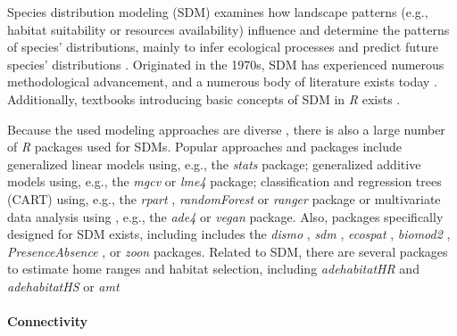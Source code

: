 \documentclass[smallextended]{svjour3}       %
\begin{document}
Species distribution modeling (SDM) examines how landscape patterns (e.g., habitat suitability or resources availability) influence and determine the patterns of species' distributions, mainly to infer ecological processes and predict future species' distributions \cite{Wiersma2011}.
Originated in the 1970s, SDM has experienced numerous methodological advancement, and a numerous body of literature exists today \cite{Zimmermann2010,Norberg2019}.
Additionally, textbooks introducing basic concepts of SDM in \emph{R} exists \cite{Guisan2017,Fletcher2019}.

Because the used modeling approaches are diverse \cite{Hooten2011,Kerr2011,Fletcher2019}, there is also a large number of \emph{R} packages used for SDMs.
Popular approaches and packages include generalized linear models using, e.g., the \emph{stats} \cite{RCoreTeam2019} package; generalized additive models using, e.g., the \emph{mgcv} \cite{Wood2017} or \emph{lme4} \cite{Bates2015} package; classification and regression trees (CART) using, e.g., the \emph{rpart} \cite{Therneau2019}, \emph{randomForest} \cite{Liaw2002} or \emph{ranger} \cite{Wright2017} package or multivariate data analysis using , e.g., the \emph{ade4} \cite{Dray2007} or \emph{vegan} \cite{Oksanen2019} package.
Also, packages specifically designed for SDM exists, including includes the \emph{dismo} \cite{Hijmans2017}, \emph{sdm} \cite{Naimi2016}, \emph{ecospat} \cite{Broennimann2020}, \emph{biomod2} \cite{Thuiller2020}, \emph{PresenceAbsence} \cite{Freeman2008}, or \emph{zoon} \cite{Golding2018} packages.
Related to SDM, there are several packages to estimate home ranges and habitat selection, including \emph{adehabitatHR} and \emph{adehabitatHS} \cite{Calenge2006} or \emph{amt \cite{Signer2019}}

\hypertarget{sec:connectivity}{%
\paragraph{Connectivity}\label{sec:connectivity}}
\end{document}
